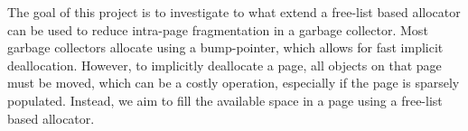
The goal of this project is to investigate to what extend a free-list based allocator can be used to reduce intra-page fragmentation in a garbage collector. Most garbage collectors allocate using a bump-pointer, which allows for fast implicit deallocation. However, to implicitly deallocate a page, all objects on that page must be moved, which can be a costly operation, especially if the page is sparsely populated. Instead, we aim to fill the available space in a page using a free-list based allocator.

